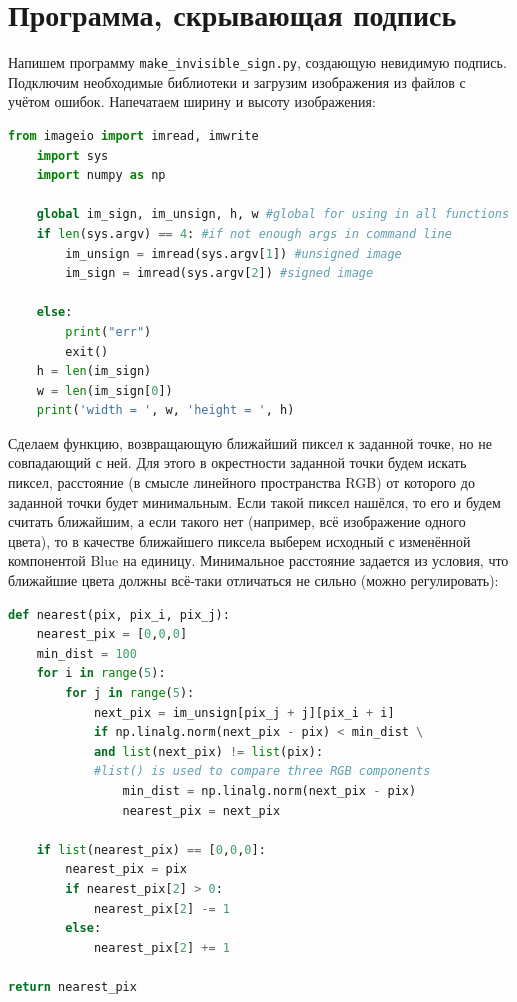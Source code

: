 \documentclass[12pt,a4paper]{scrartcl}
\begin{document}
\section{Программа, скрывающая подпись}
Напишем программу \texttt{make\_invisible\_sign.py}, создающую невидимую подпись.
Подключим необходимые библиотеки и загрузим изображения из файлов с учётом ошибок. Напечатаем ширину и высоту изображения:
\begin{lstlisting}[language=Python]
    from imageio import imread, imwrite
    import sys
    import numpy as np

    global im_sign, im_unsign, h, w #global for using in all functions
    if len(sys.argv) == 4: #if not enough args in command line
        im_unsign = imread(sys.argv[1]) #unsigned image
        im_sign = imread(sys.argv[2]) #signed image
        
    else:
        print("err")
        exit()
    h = len(im_sign)
    w = len(im_sign[0])
    print('width = ', w, 'height = ', h)
\end{lstlisting}

Сделаем функцию, возвращающую ближайший пиксел к заданной точке, но не совпадающий с ней. Для этого в окрестности заданной точки будем искать пиксел, расстояние (в смысле линейного пространства RGB) от которого до заданной точки будет минимальным. Если такой пиксел нашёлся, то его и будем считать ближайшим, а если такого нет (например, всё изображение одного цвета), то в качестве ближайшего пиксела выберем исходный с изменённой компонентой Blue на единицу. Минимальное расстояние задается из условия, что ближайшие цвета должны всё-таки отличаться не сильно (можно регулировать):
\begin{lstlisting}[language=Python]
def nearest(pix, pix_i, pix_j):
    nearest_pix = [0,0,0]
    min_dist = 100
    for i in range(5):
        for j in range(5):
            next_pix = im_unsign[pix_j + j][pix_i + i]
            if np.linalg.norm(next_pix - pix) < min_dist \
            and list(next_pix) != list(pix): 
            #list() is used to compare three RGB components 
                min_dist = np.linalg.norm(next_pix - pix)
                nearest_pix = next_pix 
                
    if list(nearest_pix) == [0,0,0]:
        nearest_pix = pix
        if nearest_pix[2] > 0:
            nearest_pix[2] -= 1
        else: 
            nearest_pix[2] += 1
    
return nearest_pix
\end{lstlisting}
\end{document}
